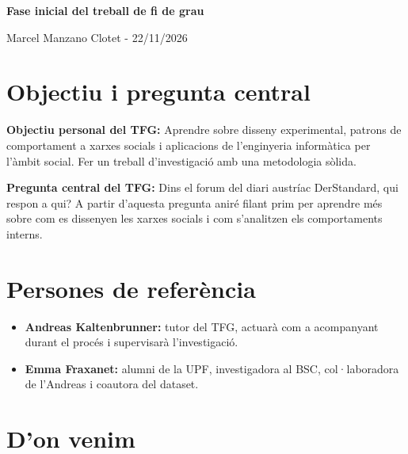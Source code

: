 \documentclass[11pt,a4paper]{article}
\begin{document}
\begin{center}
  {\sffamily\LARGE\bfseries\color{accent} Fase inicial del treball de fi de grau\par} 
  \vspace{0.6em}
  {\large Marcel Manzano Clotet - 22/11/2026\par}

\end{center}
\vspace{1em}

\section{Objectiu i pregunta central}

\textbf{Objectiu personal del TFG:} Aprendre sobre disseny experimental, patrons de comportament a xarxes socials i aplicacions de l'enginyeria informàtica per l'àmbit social. Fer un treball d'investigació amb una metodologia sòlida.

\textbf{Pregunta central del TFG:} Dins el forum del diari austríac DerStandard, qui respon a qui? A partir d'aquesta pregunta aniré filant prim per aprendre més sobre com es dissenyen les xarxes socials i com s'analitzen els comportaments interns.

\section{Persones de referència}
\begin{itemize}
  \item \textbf{Andreas Kaltenbrunner:} tutor del TFG, actuarà com a acompanyant durant el procés i supervisarà l'investigació.
  \item \textbf{Emma Fraxanet:} alumni de la UPF, investigadora al BSC, col·laboradora de l'Andreas i coautora del dataset.
\end{itemize}

\section{D'on venim}
\end{document}
